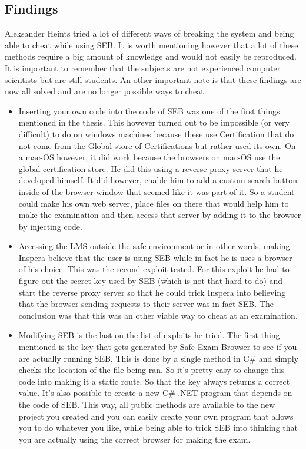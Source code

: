 \subsection{Findings}
Aleksander Heints tried a lot of different ways of breaking the system and being able to cheat while using SEB. It is worth mentioning however that a lot of these methods require a big amount of knowledge and would not easily be reproduced. It is important to remember that the subjects are not experienced computer scientists but are still students. An other important note is that these findings are now all solved and are no longer possible ways to cheat.\\

\begin{itemize}
\item Inserting your own code into the code of SEB was one of the first things mentioned in the thesis. This however turned out to be impossible (or very difficult) to do on windows machines because these use Certification that do not come from the Global store of Certifications  but rather used its own. On a mac-OS however, it did work because the browsers on mac-OS use the global certification store. He did this using a reverse proxy server that he developed himself. It did however, enable him to add a custom search button inside of the browser window that seemed like it was part of it. So a student could make his own web server, place files on there that would help him to make the examination and then access that server by adding it to the browser by injecting code.
\item Accessing the LMS outside the safe environment or in other words, making Inspera believe that the user is using SEB while in fact he is uses a browser of his choice. This was the second exploit tested. For this exploit he had to figure out the secret key used by SEB (which is not that hard to do) and start the reverse proxy server so that he could trick Inspera into believing that the browser sending requests to their server was in fact SEB. The conclusion was that this was an other viable way to cheat at an examination.
\item Modifying SEB is the last on the list of exploits he tried. The first thing mentioned is the key that gets generated by Safe Exam Browser to see if you are actually running SEB. This is done by a single method in C\# and simply checks the location of the file being ran. So it's pretty easy to change this code into making it a static route. So that the key always returns a correct value. It's also possible to create a new C\# .NET program that depends on the code of SEB. This way, all public methods are available to the new project you created and you can easily create your own program that allows you to do whatever you like, while being able to trick SEB into thinking that you are actually using the correct browser for making the exam.
\end{itemize}

